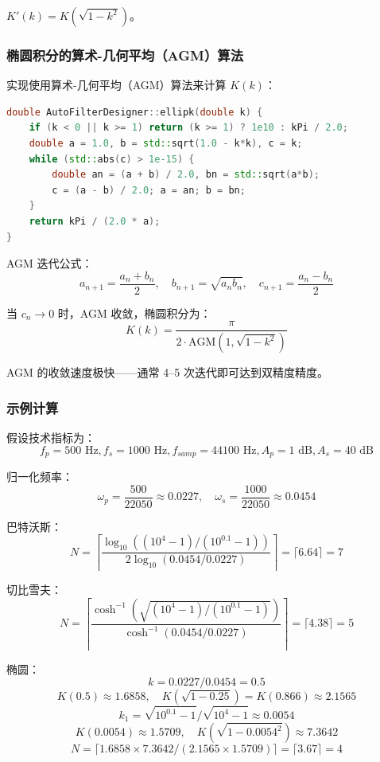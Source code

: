 ﻿\documentclass[12pt,a4paper,oneside]{ctexbook}
\begin{document}
\(K'(k) = K(\sqrt{1 - k^2})\)。

\subsubsection{椭圆积分的算术-几何平均（AGM）算法}

实现使用算术-几何平均（AGM）算法来计算 \(K(k)\)：

\begin{lstlisting}[language=C++, caption={第一类完整椭圆积分的 AGM 算法}]
double AutoFilterDesigner::ellipk(double k) {
    if (k < 0 || k >= 1) return (k >= 1) ? 1e10 : kPi / 2.0;
    double a = 1.0, b = std::sqrt(1.0 - k*k), c = k;
    while (std::abs(c) > 1e-15) {
        double an = (a + b) / 2.0, bn = std::sqrt(a*b);
        c = (a - b) / 2.0; a = an; b = bn;
    }
    return kPi / (2.0 * a);
}
\end{lstlisting}

AGM 迭代公式：
\[
a_{n+1} = \frac{a_n + b_n}{2}, \quad b_{n+1} = \sqrt{a_n b_n}, \quad c_{n+1} = \frac{a_n - b_n}{2}
\]

当 \(c_n \to 0\) 时，AGM 收敛，椭圆积分为：
\[
K(k) = \frac{\pi}{2 \cdot \text{AGM}(1, \sqrt{1-k^2})}
\]

AGM 的收敛速度极快——通常 4--5 次迭代即可达到双精度精度。

\subsubsection{示例计算}

假设技术指标为：
\[
f_p = 500\text{ Hz}, f_s = 1000\text{ Hz}, f_{samp} = 44100\text{ Hz}, A_p = 1\text{ dB}, A_s = 40\text{ dB}
\]

归一化频率：
\[
\omega_p = \frac{500}{22050} \approx 0.0227, \quad \omega_s = \frac{1000}{22050} \approx 0.0454
\]

巴特沃斯：
\[
N = \left\lceil \frac{\log_{10}((10^4 - 1) / (10^{0.1} - 1))}{2 \log_{10}(0.0454/0.0227)} \right\rceil = \lceil 6.64 \rceil = 7
\]

切比雪夫：
\[
N = \left\lceil \frac{\cosh^{-1}(\sqrt{(10^4 - 1)/(10^{0.1} - 1)})}{\cosh^{-1}(0.0454/0.0227)} \right\rceil = \lceil 4.38 \rceil = 5
\]

椭圆：
\[
k = 0.0227/0.0454 = 0.5
\]
\[
K(0.5) \approx 1.6858, \quad K(\sqrt{1-0.25}) = K(0.866) \approx 2.1565
\]
\[
k_1 = \sqrt{10^{0.1} - 1} / \sqrt{10^4 - 1} \approx 0.0054
\]
\[
K(0.0054) \approx 1.5709, \quad K(\sqrt{1 - 0.0054^2}) \approx 7.3642
\]
\[
N = \lceil 1.6858 \times 7.3642 / (2.1565 \times 1.5709) \rceil = \lceil 3.67 \rceil = 4
\]
\end{document}
